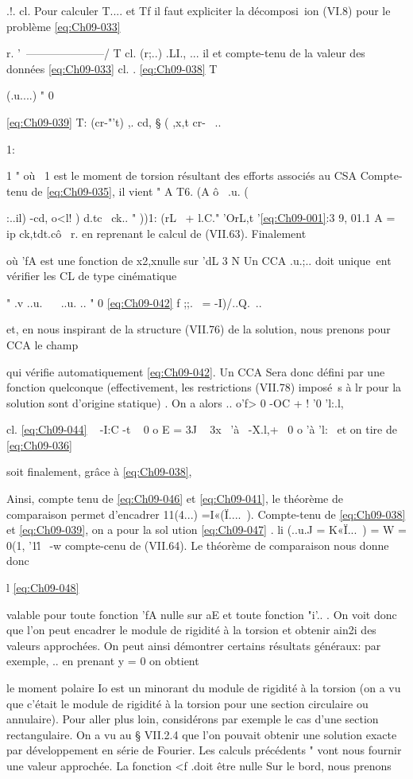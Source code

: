 {.!. cl.
Pour calculer T.... et Tf il faut expliciter la décomposi~ion (VI.8) pour le problème \eqref{eq:Ch09-033} 

r. 
'~---------------------/ 
T cl. 
(r;..)
.LI., ... il 
et compte-tenu de la valeur des données \eqref{eq:Ch09-033} 
cl. . 
\eqref{eq:Ch09-038} 
T{ (.u....) " 0 

\eqref{eq:Ch09-039} 
T: (cr-"'t) ,. cd, § ( ,x,t cr-~ .. 


1:

1 
"
où ~1 est le moment de torsion résultant des efforts associés au CSA Compte-tenu de \eqref{eq:Ch09-035}, il vient 
" 
A 
T6. (A ô~ 
.u. (}:..il) -cd, o<l! ) d.tc~ ck..
" ))1: (rL~ + l.C."
'OrL,t '\eqref{eq:Ch09-001}:3 
9, 01.1 A 
= ip ck,tdt.cô
~r. 
en reprenant le calcul de (VII.63). Finalement 

où 'fA est une fonction de x2,xnulle sur 'dL
3 
N 
Un CCA .u.;.. doit unique~ent vérifier les CL de type cinématique 

" .v 
..u.~ ~ ..u. .. " 0 
\eqref{eq:Ch09-042} f 
;;.~ = -I)/..Q.~.. 

et, en nous inspirant de la structure (VII.76) de la solution, nous prenons pour CCA le champ 

qui vérifie automatiquement \eqref{eq:Ch09-042}. Un CCA Sera donc défini par une fonction quelconque (effectivement, les restrictions (VII.78) imposé~s à lr pour la solution sont d'origine statique) . On a alors 
.. 
o'f>
0 -OC +
! 
'0 'l:.l, 

cl.
\eqref{eq:Ch09-044} ~ 
-I:C -t ~ 0 o
E = 
3J 
~ 3x~ 
'à~ 
-X.l,+~ 0 o 'à 'l:~ 
et on tire de \eqref{eq:Ch09-036} 

soit finalement, grâce à \eqref{eq:Ch09-038}, 

Ainsi, compte tenu de \eqref{eq:Ch09-046} et \eqref{eq:Ch09-041}, le théorème de comparaison permet d'encadrer 11(4...) =I«(Ï....~). Compte-tenu de \eqref{eq:Ch09-038} et \eqref{eq:Ch09-039}, on a pour la sol ution 
\eqref{eq:Ch09-047} . li (..u.J = K«Ï...~) = W = 0(1, '1l\.~ -w 
compte-cenu de (VII.64). Le théorème de comparaison nous donne donc 


l 
\eqref{eq:Ch09-048} 


valable pour toute fonction 'fA nulle sur aE et toute fonction "i'.. . On voit 
donc que l'on peut encadrer le module de rigidité à la torsion et obtenir ain2i des valeurs approchées. 
On peut ainsi démontrer certains résultats généraux: par exemple,
.. 
en prenant y = 0 on obtient 

le moment polaire Io est un minorant du module de rigidité à la torsion (on a vu que c'était le module de rigidité à la torsion pour une section circulaire ou annulaire). 
Pour aller plus loin, considérons par exemple le cas d'une sec­tion rectangulaire. On a vu au § VII.2.4 que l'on pouvait obtenir une so­lution exacte par développement en série de Fourier. Les calculs précédents 
"
vont nous fournir une valeur approchée. La fonction <f .doit être nulle Sur le bord, nous prenons 

}
